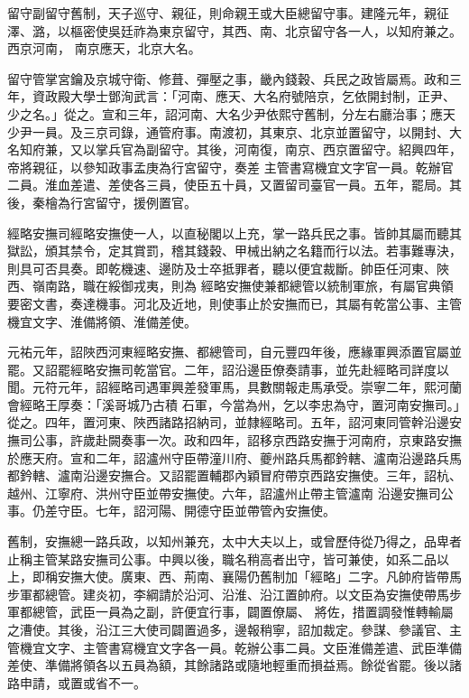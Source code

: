 \begin{pinyinscope}
 留守副留守舊制，天子巡守、親征，則命親王或大臣總留守事。建隆元年，親征澤、潞，以樞密使吳廷祚為東京留守，其西、南、北京留守各一人，以知府兼之。西京河南，
 南京應天，北京大名。



 留守管掌宮鑰及京城守衛、修葺、彈壓之事，畿內錢穀、兵民之政皆屬焉。政和三年，資政殿大學士鄧洵武言：「河南、應天、大名府號陪京，乞依開封制，正尹、少之名。」從之。宣和三年，詔河南、大名少尹依熙守舊制，分左右廳治事；應天少尹一員。及三京司錄，通管府事。南渡初，其東京、北京並置留守，以開封、大名知府兼，又以掌兵官為副留守。其後，河南復，南京、西京置留守。紹興四年，帝將親征，以參知政事孟庚為行宮留守，奏差
 主管書寫機宜文字官一員。乾辦官二員。淮血差遣、差使各三員，使臣五十員，又置留司臺官一員。五年，罷局。其後，秦檜為行宮留守，援例置官。



 經略安撫司經略安撫使一人，以直秘閣以上充，掌一路兵民之事。皆帥其屬而聽其獄訟，頒其禁令，定其賞罰，稽其錢穀、甲械出納之名籍而行以法。若事難專決，則具可否具奏。即乾機速、邊防及士卒抵罪者，聽以便宜裁斷。帥臣任河東、陜西、嶺南路，職在綏御戎夷，則為
 經略安撫使兼都總管以統制軍旅，有屬官典領要密文書，奏達機事。河北及近地，則使事止於安撫而已，其屬有乾當公事、主管機宜文字、淮備將領、淮備差使。



 元祐元年，詔陜西河東經略安撫、都總管司，自元豐四年後，應緣軍興添置官屬並罷。又詔罷經略安撫司乾當官。二年，詔沿邊臣僚奏請事，並先赴經略司詳度以聞。元符元年，詔經略司遇軍興差發軍馬，具數關報走馬承受。崇寧二年，熙河蘭會經略王厚奏：「溪哥城乃古積
 石軍，今當為州，乞以李忠為守，置河南安撫司。」從之。四年，置河東、陜西諸路招納司，並隸經略司。五年，詔河東同管幹沿邊安撫司公事，許歲赴闕奏事一次。政和四年，詔移京西路安撫于河南府，京東路安撫於應天府。宣和二年，詔瀘州守臣帶潼川府、夔州路兵馬都鈐轄、瀘南沿邊路兵馬都鈐轄、瀘南沿邊安撫合。又詔罷置輔郡內穎冒府帶京西路安撫使。三年，詔杭、越州、江寧府、洪州守臣並帶安撫使。六年，詔瀘州止帶主管瀘南
 沿邊安撫司公事。仍差守臣。七年，詔河陽、開德守臣並帶管內安撫使。



 舊制，安撫總一路兵政，以知州兼充，太中大夫以上，或曾歷侍從乃得之，品卑者止稱主管某路安撫司公事。中興以後，職名稍高者出守，皆可兼使，如系二品以上，即稱安撫大使。廣東、西、荊南、襄陽仍舊制加「經略」二字。凡帥府皆帶馬步軍都總管。建炎初，李綱請於沿河、沿淮、沿江置帥府。以文臣為安撫使帶馬步軍都總管，武臣一員為之副，許便宜行事，闢置僚屬、
 將佐，措置調發惟轉輸屬之漕使。其後，沿江三大使司闢置過多，邊報稍寧，詔加裁定。參謀、參議官、主管機宜文字、主管書寫機宜文字各一員。乾辦公事二員。文臣淮備差遣、武臣準備差使、準備將領各以五員為額，其餘諸路或隨地輕重而損益焉。餘從省罷。後以諸路申請，或置或省不一。




\end{pinyinscope}
